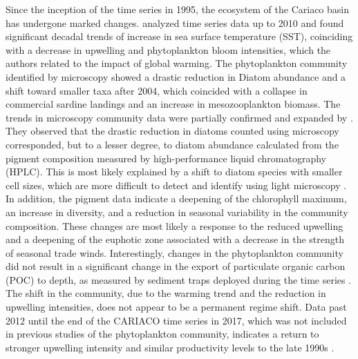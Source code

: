 \documentclass[draft]{agujournal2019}
\begin{document}
    Since the inception of the time series in 1995, the ecosystem of the Cariaco basin has undergone marked changes.  analyzed time series data up to 2010 and found significant decadal trends of increase in sea surface temperature (SST), coinciding with a decrease in upwelling and phytoplankton bloom intensities, which the authors related to the impact of global warming. The phytoplankton community identified by microscopy showed a drastic reduction in Diatom abundance and a shift toward smaller taxa after 2004, which coincided with a collapse in commercial sardine landings and an increase in mesozooplankton biomass.
    The trends in microscopy community data were partially confirmed and expanded by . They observed that the drastic reduction in diatoms counted using microscopy corresponded, but to a lesser degree, to diatom abundance calculated from the pigment composition measured by high-performance liquid chromatography (HPLC). This is most likely explained by a shift to diatom species with smaller cell sizes, which are more difficult to detect and identify using light microscopy \cite{lorenzoni_characterization_2015}. In addition, the pigment data indicate a deepening of the chlorophyll maximum, an increase in diversity, and a reduction in seasonal variability in the community composition. These changes are most likely a response to the reduced upwelling and a deepening of the euphotic zone associated with a decrease in the strength of seasonal trade winds. Interestingly, changes in the phytoplankton community did not result in a significant change in the export of particulate organic carbon (POC) to depth, as measured by sediment traps deployed during the time series \cite{pinckney_phytoplankton_2015}.
    The shift in the community, due to the warming trend and the reduction in upwelling intensities, does not appear to be a permanent regime shift. Data past 2012 until the end of the CARIACO time series in 2017, which was not included in previous studies of the phytoplankton community, indicates a return to stronger upwelling intensity and similar productivity levels to the late 1990s \cite{muller-karger_scientific_2019}.
\end{document}

